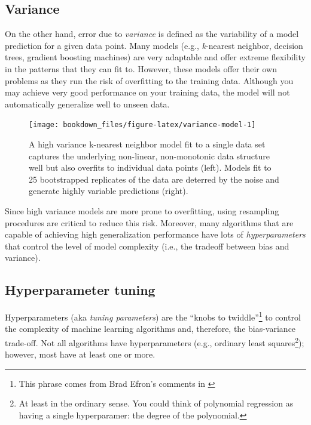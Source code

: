 \documentclass[]{krantz}
\begin{document}
\hypertarget{variance}{%
\subsection{Variance}\label{variance}}

On the other hand, error due to \emph{variance} is defined as the variability of a model prediction for a given data point. Many models (e.g., \emph{k}-nearest neighbor, decision trees, gradient boosting machines) are very adaptable and offer extreme flexibility in the patterns that they can fit to. However, these models offer their own problems as they run the risk of overfitting to the training data. Although you may achieve very good performance on your training data, the model will not automatically generalize well to unseen data.

\begin{figure}

{\centering \texttt{[image: bookdown\_files/figure-latex/variance-model-1]} 

}

\caption{A high variance k-nearest neighbor model fit to a single data set captures the underlying non-linear, non-monotonic data structure well but also overfits to individual data points (left).  Models fit to 25 bootstrapped replicates of the data are deterred by the noise and generate highly variable predictions (right).}\label{fig:variance-model}
\end{figure}

Since high variance models are more prone to overfitting, using resampling procedures are critical to reduce this risk. Moreover, many algorithms that are capable of achieving high generalization performance have lots of \emph{hyperparameters} that control the level of model complexity (i.e., the tradeoff between bias and variance).

\hypertarget{tune-overfit}{%
\subsection{Hyperparameter tuning}\label{tune-overfit}}

Hyperparameters (aka \emph{tuning parameters}) are the ``knobs to twiddle''\footnote{This phrase comes from Brad Efron's comments in \citet{breiman2001statistical}} to control the complexity of machine learning algorithms and, therefore, the bias-variance trade-off. Not all algorithms have hyperparameters (e.g., ordinary least squares\footnote{At least in the ordinary sense. You could think of polynomial regression as having a single hyperparamer: the degree of the polynomial.}); however, most have at least one or more.
\end{document}
